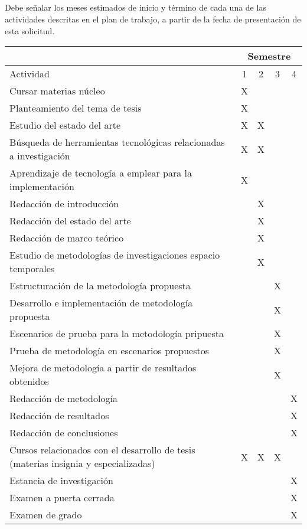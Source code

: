 \documentclass[runningheads,a4paper]{llncs}
\begin{document}
\subsection{ }
Debe señalar los meses estimados de inicio y término de cada una de las
actividades descritas en el plan de trabajo, a partir de la fecha de
presentación de esta solicitud.
\begin{table}
\begin{center}
 \begin{tabular}{|l|c|c|c|c|}
\hline              
            & \multicolumn{4}{|c|}{Semestre} \\
\hline
Actividad   & 1 & 2 & 3 & 4 \\ \hline
Cursar materias núcleo &  X  &   &   &   \\ \hline
Planteamiento del tema de tesis &  X  &   &   &   \\ \hline
Estudio del estado del arte &  X  & X  &   &   \\ \hline
Búsqueda de herramientas tecnológicas relacionadas a investigación &  X  &  X &
&   \\ \hline
Aprendizaje de tecnología a emplear para la implementación &  X  &   &   &   \\ \hline
Redacción de introducción &    &  X &   &   \\ \hline
Redacción del estado del arte &    & X  &   &   \\ \hline
Redacción de marco teórico &    &  X &   &   \\ \hline
Estudio de metodologías de investigaciones espacio temporales &    & X  &   &
\\ \hline
Estructuración de la metodología propuesta &    &   &  X &   \\ \hline
Desarrollo e implementación de metodología propuesta &    &   &  X &   \\ \hline
Escenarios de prueba para la metodología pripuesta &    &   & X  &   \\ \hline
Prueba de metodología en escenarios propuestos &    &   &  X &   \\ \hline
Mejora de metodología a partir de resultados obtenidos &    &   & X  &   \\ \hline
Redacción de metodología &    &   &   & X  \\ \hline
Redacción de resultados &    &   &   &  X \\ \hline
Redacción de conclusiones &    &   &   & X  \\ \hline
Cursos relacionados con el desarrollo de tesis (materias insignia y
especializadas) &  X  &  X & X  &   \\ \hline
Estancia de investigación &    &   &   &  X \\ \hline
Examen a puerta cerrada &    &   &   &  X \\ \hline
Examen de grado &    &   &   &  X \\ \hline

\end{tabular}
\end{center}
\end{table}
\end{document}
